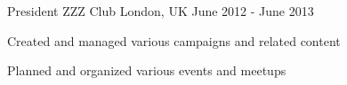 

\begin{cventries}

  \cventry
    {President} %
    {ZZZ Club} %
    {London, UK} %
    {June 2012 - June 2013} %
    {
      \begin{cvitems} %
        \item {Created and managed various campaigns and related content}
        \item {Planned and organized various events and meetups}
      \end{cvitems}
    }

\end{cventries}
